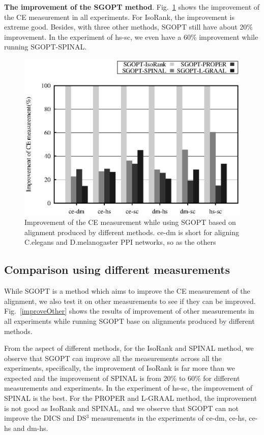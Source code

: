 \documentclass{bioinfo}
\theoremstyle{definition}
\begin{document}
\textbf{The improvement of the SGOPT method}. Fig.~\ref{improveCE} shows the improvement of the CE measurement in all experiments. For IsoRank, the improvement is extreme good. Besides, with three other methods, SGOPT still have about 20\% improvement. In the experiment of hs-sc, we even have a 60\% improvement while running SGOPT-SPINAL. 
\begin{figure}[!htbp]
    \centering
    \includegraphics[width=\linewidth]{pic/improveCE.eps}
    \caption{Improvement of the CE measurement while using SGOPT based on alignment produced by different methods. ce-dm is short for aligning C.elegans and D.melanogaster PPI networks, so as the others}
    \label{improveCE}
\end{figure}

\subsection{Comparison using different measurements}
While SGOPT is a method which aims to improve the CE measurement of the alignment, we also test it on other measurements to see if they can be improved. Fig.~\ref{improveOther} shows the results of improvement of other measurements in all experiments while running SGOPT base on alignments produced by different methods. 

From the aspect of different methods, for the IsoRank and SPINAL method, we observe that SGOPT can improve all the measurements across all the experiments, specifically, the improvement of IsoRank is far more than we expected and the improvement of SPINAL is from 20\% to 60\% for different measurements and experiments. In the experiment of hs-sc, the improvement of SPINAL is the best. For the PROPER and L-GRAAL method, the improvement is not good as IsoRank and SPINAL, and we observe that SGOPT can not improve the DICS and DS$^3$ measurements in the experiments of ce-dm, ce-hs, ce-hs and dm-hs.
\end{document}
